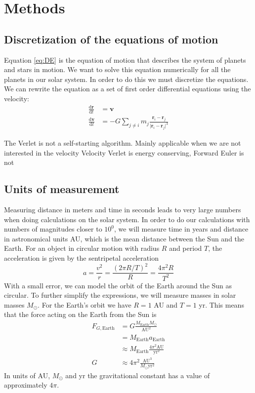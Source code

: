 \documentclass[reprint, english,notitlepage,nofootinbib]{revtex4-1}  %
\newcommand{\vc}[1]{\mathbf{#1}}
\begin{document}
\section{Methods}

\subsection{Discretization of the equations of motion}

Equation \ref{eq:DE} is the equation of motion that describes the system of planets and stars in motion. We want to solve this equation numerically for all the planets in our solar system. In order to do this we must discretize the equations. We can rewrite the equation as a set of first order differential equations using the velocity:
\begin{align*}
   \frac{\mathrm d \vc r}{\mathrm d t} &= \vc v \\
   \frac{\mathrm d \vc v}{\mathrm d t} &= - G \sum_{j \neq i} m_j \frac{\vc r_i - \vc r_j}{ \lvert \vc r_i - \vc r_j \rvert ^3}
\end{align*}

The Verlet is not a self-starting algorithm.
Mainly applicable when we are not interested in the velocity
Velocity Verlet is energy conserving, Forward Euler is not


\subsection{Units of measurement}

Measuring distance in meters and time in seconds leads to very large numbers when doing calculations on the solar system. In order to do our calculations with numbers of magnitudes closer to $10^0$, we will measure time in years and distance in astronomical units AU, which is the mean distance between the Sun and the Earth. For an object in circular motion with radius $R$ and period $T$, the acceleration is given by the sentripetal acceleration
\begin{equation*}
  a = \frac{v^2}{r} = \frac{(2 \pi R / T)^2}{R} = \frac{4 \pi^2 R}{T^2}
\end{equation*}
With a small error, we can model the orbit of the Earth around the Sun as circular. To further simplify the expressions, we will measure masses in solar masses $M_\odot$. For the Earth's orbit we have $R = 1$ AU and $T = 1$ yr. This means that the force acting on the Earth from the Sun is
\begin{align*}
  F_{G, \text{Earth}} &= G \frac{M_{\text{Earth}} M_\odot}{\text{AU}^2} \\
  &= M_{\text{Earth}} a_{\text{Earth}} \\
  &\approx M_{\text{Earth}} \frac{4 \pi^2 \text{AU}}{\text{yr}^2} \\
  G &\approx 4 \pi^2 \frac{\text{AU}^3}{M_\odot \text{yr}^2}
\end{align*}
In units of AU, $M_\odot$ and yr the gravitational constant has a value of approximately $4 \pi$.
\end{document}

